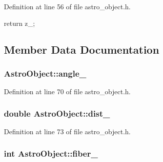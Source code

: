 Definition at line 56 of file astro\-\_\-object.\-h.


\begin{DoxyCode}
{return z_;}
\end{DoxyCode}


\subsection{Member Data Documentation}
\hypertarget{class_astro_object_a78ea0158bd580946e621b534419bcd8f}{
\subsubsection[{angle\-\_\-}]{ {\bf Astro\-Object\-::angle\-\_\-}}}\label{class_astro_object_a78ea0158bd580946e621b534419bcd8f}


Definition at line 70 of file astro\-\_\-object.\-h.

\hypertarget{class_astro_object_a3644701bfa2f9de2343242e5fca7df86}{
\subsubsection[{dist\-\_\-}]{\setlength{\rightskip}{0pt plus 5cm}double {\bf Astro\-Object\-::dist\-\_\-}}}\label{class_astro_object_a3644701bfa2f9de2343242e5fca7df86}


Definition at line 73 of file astro\-\_\-object.\-h.

\hypertarget{class_astro_object_a0f2dfed713d41bf6403b55ded214e044}{
\subsubsection[{fiber\-\_\-}]{\setlength{\rightskip}{0pt plus 5cm}int {\bf Astro\-Object\-::fiber\-\_\-}}}\label{class_astro_object_a0f2dfed713d41bf6403b55ded214e044}


